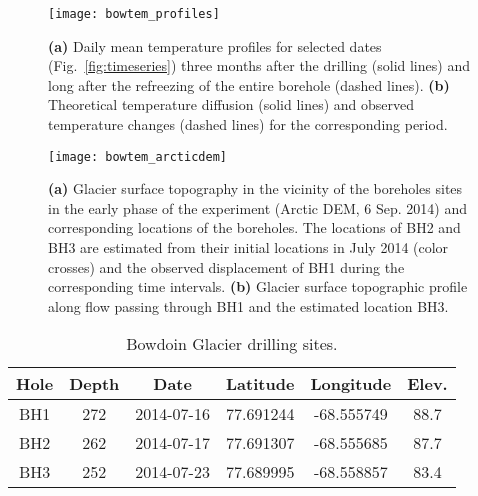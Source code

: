 \documentclass[utf8]{article}
\begin{document}
    \begin{figure}
      \centerline{\texttt{[image: bowtem\_profiles]}}
      \caption{\textbf{(a)} Daily mean temperature profiles for selected dates
               (Fig.~\ref{fig:timeseries}) three months after the drilling
               (solid lines) and long after the refreezing of the entire
               borehole (dashed lines).
               \textbf{(b)} Theoretical temperature diffusion (solid lines) and
               observed temperature changes (dashed lines) for the
               corresponding period.}
      \label{fig:profiles}
    \end{figure}

    \begin{figure}
      \centerline{\texttt{[image: bowtem\_arcticdem]}}
      \caption{\textbf{(a)} Glacier surface topography in the vicinity of the
               boreholes sites in the early phase of the experiment (Arctic
               DEM, 6 Sep. 2014) and corresponding locations of the boreholes.
               The locations of BH2 and BH3 are estimated from their initial
               locations in July 2014 (color crosses) and the observed
               displacement of BH1 during the corresponding time intervals.
               \textbf{(b)} Glacier surface topographic profile along flow
               passing through BH1 and the estimated location BH3.}
      \label{fig:arcticdem}
    \end{figure}


\clearpage

    \begin{table}[t]
      \caption{%
        Bowdoin Glacier drilling sites.}
      \label{tab:drilling}
      {\begin{tabular}{cccccc}
        \hline
        Hole & Depth & Date       & Latitude  & Longitude  & Elev. \\
        \hline
        BH1  & 272   & 2014-07-16 & 77.691244 & -68.555749 & 88.7 \\ %
        BH2  & 262   & 2014-07-17 & 77.691307 & -68.555685 & 87.7 \\ %
        BH3  & 252   & 2014-07-23 & 77.689995 & -68.558857 & 83.4 \\ %
        \hline
      \end{tabular}}
    \end{table}
\end{document}
